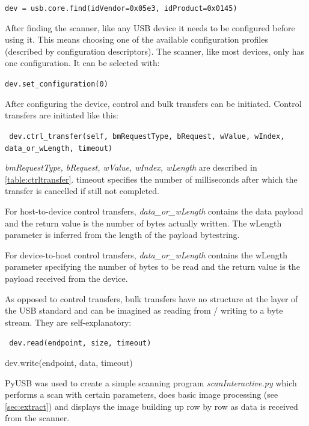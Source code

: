 \documentclass{article}
\begin{document}
\begin{center}
\tt dev = usb.core.find(idVendor=0x05e3, idProduct=0x0145)
\end{center}

After finding the scanner, like any USB device it needs to be configured
before using it. This means choosing one of the available configuration
profiles (described by configuration descriptors). The scanner, like most
devices, only has one configuration. It can be selected with:

\begin{center}
\tt dev.set\_configuration(0)
\end{center}

After configuring the device, control and bulk transfers can be initiated.
Control transfers are initiated like this:

\begin{center}
\tt
dev.ctrl\_transfer(self, bmRequestType, bRequest, wValue, wIndex, data\_or\_wLength, timeout)
\end{center}

{\it bmRequestType, bRequest, wValue, wIndex, wLength} are described in \autoref{table:ctrltransfer}.
timeout specifies the number of milliseconds after which the transfer is cancelled if
still not completed.

For host-to-device control transfers, {\it data\_or\_wLength} contains the data payload
and the return value is the number of bytes actually written. The wLength parameter
is inferred from the length of the payload bytestring.

For device-to-host control transfers, {\it data\_or\_wLength} contains the wLength
parameter specifying the number of bytes to be read and the return value is the payload
received from the device.

As opposed to control transfers, bulk transfers have no structure at the layer
of the USB standard and can be imagined as reading from / writing to a byte stream.
They are self-explanatory:

\begin{center}
\tt
dev.read(endpoint, size, timeout)

dev.write(endpoint, data, timeout)
\end{center}

PyUSB was used to create a simple scanning program {\it scanInteractive.py}
which performs a scan with certain parameters, does basic image processing
(see \ref{sec:extract}) and displays the image building up row by row
as data is received from the scanner.
\end{document}
